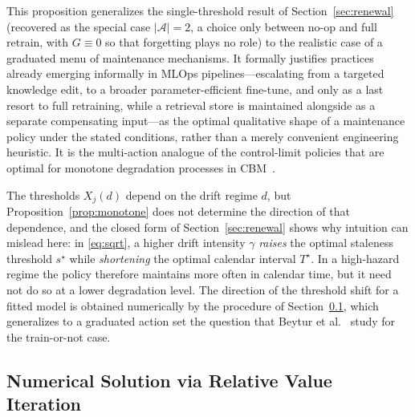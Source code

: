 \documentclass[electronics,article,submit,pdftex,moreauthors]{Definitions/mdpi}
\newcommand{\calA}{\mathcal{A}}
\begin{document}
This proposition generalizes the single-threshold result of Section~\ref{sec:renewal} (recovered as the special case $|\calA|=2$, a choice only between no-op and full retrain, with $G\equiv 0$ so that forgetting plays no role) to the realistic case of a graduated menu of maintenance mechanisms. It formally justifies practices already emerging informally in MLOps pipelines---escalating from a targeted knowledge edit, to a broader parameter-efficient fine-tune, and only as a last resort to full retraining, while a retrieval store is maintained alongside as a separate compensating input---as the optimal qualitative shape of a maintenance policy under the stated conditions, rather than a merely convenient engineering heuristic. It is the multi-action analogue of the control-limit policies that are optimal for monotone degradation processes in CBM~\cite{Wang2002}.

The thresholds $X_j(d)$ depend on the drift regime $d$, but Proposition~\ref{prop:monotone} does not determine the direction of that dependence, and the closed form of Section~\ref{sec:renewal} shows why intuition can mislead here: in \eqref{eq:sqrt}, a higher drift intensity $\gamma$ \textit{raises} the optimal staleness threshold $s^\star$ while \textit{shortening} the optimal calendar interval $T^\star$. In a high-hazard regime the policy therefore maintains more often in calendar time, but it need not do so at a lower degradation level. The direction of the threshold shift for a fitted model is obtained numerically by the procedure of Section~\ref{sec:rvi}, which generalizes to a graduated action set the question that Beytur et al.~\cite{Beytur2025} study for the train-or-not case.

\subsection{Numerical Solution via Relative Value Iteration}\label{sec:rvi}
\end{document}
